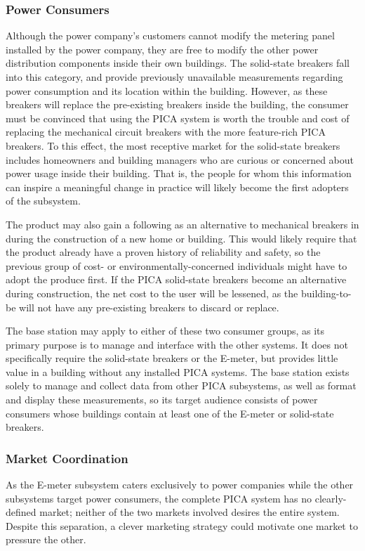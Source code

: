\subsubsection{Power Consumers}
Although the power company's customers cannot modify the metering panel installed by the power company, they are free to modify the other power distribution components inside their own buildings. The solid-state breakers fall into this category, and provide previously unavailable measurements regarding power consumption and its location within the building. However, as these breakers will replace the pre-existing breakers inside the building, the consumer must be convinced that using the PICA system is worth the trouble and cost of replacing the mechanical circuit breakers with the more feature-rich PICA breakers. To this effect, the most receptive market for the solid-state breakers includes homeowners and building managers who are curious or concerned about power usage inside their building. That is, the people for whom this information can inspire a meaningful change in practice will likely become the first adopters of the subsystem.

The product may also gain a following as an alternative to mechanical breakers in during the construction of a new home or building. This would likely require that the product already have a proven history of reliability and safety, so the previous group of cost- or environmentally-concerned individuals might have to adopt the produce first. If the PICA solid-state breakers become an alternative during construction, the net cost to the user will be lessened, as the building-to-be will not have any pre-existing breakers to discard or replace.

The base station may apply to either of these two consumer groups, as its primary purpose is to manage and interface with the other systems. It does not specifically require the solid-state breakers or the E-meter, but provides little value in a building without any installed PICA systems. The base station exists solely to manage and collect data from other PICA subsystems, as well as format and display these measurements, so its target audience consists of power consumers whose buildings contain at least one of the E-meter or solid-state breakers.

\subsubsection{Market Coordination}
As the E-meter subsystem caters exclusively to power companies while the other subsystems target power consumers, the complete PICA system has no clearly-defined market; neither of the two markets involved desires the entire system. Despite this separation, a clever marketing strategy could motivate one market to pressure the other.

